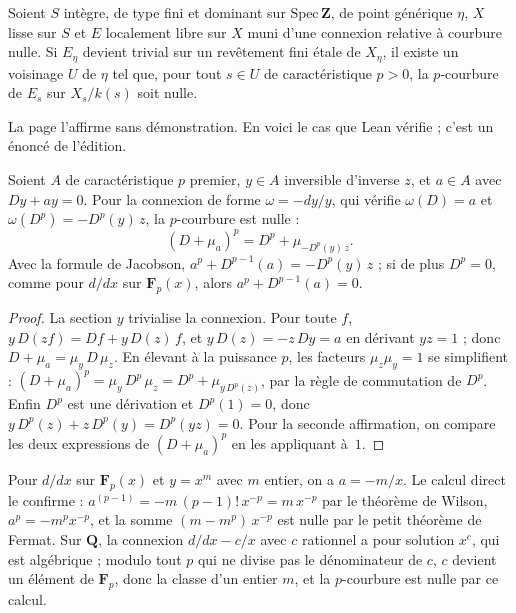 \begin{encadre}
\begin{theoreme}\nonverifie
Soient $S$ intègre, de type fini et dominant sur $\mathrm{Spec}\,\mathbf Z$, de point générique $\eta$, $X$ lisse sur $S$ et $E$ localement libre sur $X$ muni d'une connexion relative à courbure nulle. Si $E_\eta$ devient trivial sur un revêtement fini étale de $X_\eta$, il existe un voisinage $U$ de $\eta$ tel que, pour tout $s \in U$ de caractéristique $p > 0$, la $p$-courbure de $E_s$ sur $X_s/k(s)$ soit nulle.
\end{theoreme}
\end{encadre}

La page l'affirme sans démonstration. En voici le cas que Lean vérifie ; c'est un énoncé de l'édition.

\begin{enonce}
Soient $A$ de caractéristique $p$ premier, $y \in A$ inversible d'inverse $z$, et $a \in A$ avec $Dy + ay = 0$. Pour la connexion de forme $\omega = -dy/y$, qui vérifie $\omega(D) = a$ et $\omega(D^p) = -D^p(y)\,z$, la $p$-courbure est nulle :
\[
(D + \mu_a)^p = D^p + \mu_{-D^p(y)\,z} .
\]
Avec la formule de Jacobson, $a^p + D^{p-1}(a) = -D^p(y)\,z$ ; si de plus $D^p = 0$, comme pour $d/dx$ sur $\mathbf F_p(x)$, alors $a^p + D^{p-1}(a) = 0$.
\end{enonce}

\begin{proof}
La section $y$ trivialise la connexion. Pour toute $f$, $y\,D(zf) = Df + y\,D(z)\,f$, et $y\,D(z) = -z\,Dy = a$ en dérivant $yz = 1$ ; donc $D + \mu_a = \mu_y\, D\, \mu_z$. En élevant à la puissance $p$, les facteurs $\mu_z\mu_y = 1$ se simplifient : $(D + \mu_a)^p = \mu_y\, D^p\, \mu_z = D^p + \mu_{y\,D^p(z)}$, par la règle de commutation de $D^p$. Enfin $D^p$ est une dérivation et $D^p(1) = 0$, donc $y\,D^p(z) + z\,D^p(y) = D^p(yz) = 0$. Pour la seconde affirmation, on compare les deux expressions de $(D + \mu_a)^p$ en les appliquant à~$1$.
\end{proof}

Pour $d/dx$ sur $\mathbf F_p(x)$ et $y = x^m$ avec $m$ entier, on a $a = -m/x$. Le calcul direct le confirme : $a^{(p-1)} = -m\,(p-1)!\,x^{-p} = m\,x^{-p}$ par le théorème de Wilson, $a^p = -m^p x^{-p}$, et la somme $(m - m^p)\,x^{-p}$ est nulle par le petit théorème de Fermat. Sur $\mathbf Q$, la connexion $d/dx - c/x$ avec $c$ rationnel a pour solution $x^c$, qui est algébrique ; modulo tout $p$ qui ne divise pas le dénominateur de $c$, $c$ devient un élément de $\mathbf F_p$, donc la classe d'un entier $m$, et la $p$-courbure est nulle par ce calcul.


